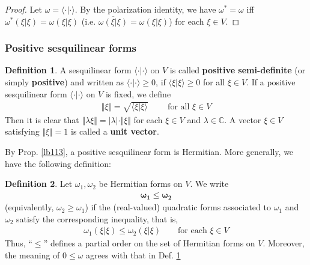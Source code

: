 \documentclass[12pt,b5paper,notitlepage]{article}
\theoremstyle{definition}
\newtheorem{df}{Definition}[subsection]
\theoremstyle{plain}
\newcommand{\ovl}{\overline}
\newcommand{\bk}[1]{\langle {#1}\rangle}
\newcommand{\Cbb}{\mathbb C}
\numberwithin{equation}{section}
\begin{document}
\begin{proof}
Let $\omega=\bk{\cdot|\cdot}$. By the polarization identity, we have $\omega^*=\omega$ iff $\omega^*(\xi|\xi)=\omega(\xi|\xi)$ (i.e. $\ovl{\omega(\xi|\xi)}=\omega(\xi|\xi)$) for each $\xi\in V$. 
\end{proof}



\subsubsection{Positive sesquilinear forms}


\begin{df}\label{lb139}
A sesquilinear form $\bk{\cdot|\cdot}$ on $V$ is called \textbf{positive semi-definite} (or simply \textbf{positive}) and written as $\bk{\cdot|\cdot}\geq0$,  if $\bk{\xi|\xi}\geq0$ for all $\xi\in V$. If a positive sesquilinear form $\bk{\cdot|\cdot}$ on $V$ is fixed, we define
\begin{align}
\Vert \xi\Vert=\sqrt{\bk{\xi|\xi}}\qquad\text{ for all }\xi\in V
\end{align} 
Then it is clear that $\Vert\lambda \xi\Vert=|\lambda|\cdot\Vert \xi\Vert$ for each $\xi\in V$ and $\lambda\in\Cbb$. A vector $\xi\in V$ satisfying $\Vert \xi\Vert=1$ is called a \textbf{unit vector}.  
\end{df}

By Prop. \ref{lb113}, a positive sesquilinear form is Hermitian. More generally, we have the following definition:

\begin{df}\label{lb140}
Let $\omega_1,\omega_2$ be Hermitian forms on $V$. We write
\begin{align*}
\pmb{\omega_1\leq\omega_2}
\end{align*}
(equivalently, $\omega_2\geq\omega_1$) if the (real-valued) quadratic forms associated to $\omega_1$ and $\omega_2$ satisfy the corresponding inequality, that is,
\begin{align*}
\omega_1(\xi|\xi)\leq\omega_2(\xi|\xi)\qquad\text{for each }\xi\in V
\end{align*}
Thus, ``$\leq$'' defines a partial order on the set of Hermitian forms on $V$. Moreover, the meaning of $0\leq\omega$ agrees with that in Def. \ref{lb139}
\end{df}
\end{document}
